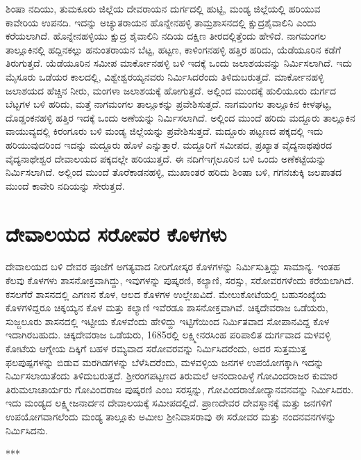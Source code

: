 ಶಿಂಷಾ ನದಿಯು, ತುಮಕೂರು ಜಿಲ್ಲೆಯ ದೇವರಾಯನ ದುರ್ಗದಲ್ಲಿ ಹುಟ್ಟಿ, ಮಂಡ್ಯ ಜಿಲ್ಲೆಯಲ್ಲಿ ಹರಿಯುವ ಕಾವೇರಿಯ ಉಪನದಿ. ಇದನ್ನು ಅಚ್ಯುತರಾಯನ ಹೊನ್ನೇನಹಳ್ಳಿ ತಾಮ್ರಶಾಸನದಲ್ಲಿ ಕ್ಷುದ್ರಶೈವಾಲಿನಿ ಎಂದು ಕರೆಯಲಾಗಿದೆ. ಹೊನ್ನೇನಹಳ್ಳಿಯು ಕ್ಷುದ್ರ ಶೈವಾಲಿನಿ ನದಿಯ ದಕ್ಷಿಣ ತೀರದಲ್ಲಿತ್ತೆಂದು ಹೇಳಿದೆ. ನಾಗಮಂಗಲ ತಾಲ್ಲೂಕಿನಲ್ಲಿ ಹದ್ದಿನ\-ಕಲ್ಲು ಹನುಂತರಾಯನ ಬೆಟ್ಟ, ಹಟ್ಟಣ, ಕಾಳಿಂಗನಹಳ್ಳಿ ಹತ್ತಿರ ಹರಿದು, \hbox{ಯೆಡೆಯೂರಿನ} ಕಡೆಗೆ ತಿರುಗುತ್ತದೆ. \hbox{ಯೆಡೆಯೂರಿನ} ಸಮೀಪ ಮಾರ್ಕೋನಹಳ್ಳಿ ಬಳಿ ಇದಕ್ಕೆ ಒಂದು ಜಲಾಶಯವನ್ನು ನಿರ್ಮಿಸಲಾಗಿದೆ. ಇದು ಮೈಸೂರು ಒಡೆಯರ ಕಾಲದಲ್ಲಿ, ವಿಶ್ವೇಶ್ವರಯ್ಯನವರು ನಿರ್ಮಿಸಿದರೆಂದು ತಿಳಿದುಬರುತ್ತದೆ. ಮಾರ್ಕೋನಹಳ್ಳಿ ಜಲಾಶಯದ ಹೆಚ್ಚಿನ ನೀರು, ಮಂಗಳಾ ಜಲಾಶಯಕ್ಕೆ ಹೋಗುತ್ತದೆ. ಅಲ್ಲಿಂದ ಮುಂದಕ್ಕೆ ಹುಲಿಯೂರು ದುರ್ಗದ ಬೆಟ್ಟಗಳ ಬಳಿ ಹರಿದು, ಮತ್ತೆ ನಾಗಮಂಗಲ ತಾಲ್ಲೂಕನ್ನು ಪ್ರವೇಶಿಸುತ್ತದೆ. ನಾಗಮಂಗಲ ತಾಲ್ಲೂಕಿನ ಕೀಳಘಟ್ಟ, ದೊಡ್ಡಂಕನಹಳ್ಳಿ ಹತ್ತಿರ ಇದಕ್ಕೆ ಒಂದು ಅಣೆಯನ್ನು ನಿರ್ಮಿಸಲಾಗಿದೆ. ಅಲ್ಲಿಂದ ಮುಂದೆ ಹರಿದು ಮದ್ದೂರು ತಾಲ್ಲೂಕಿನ ವಾಯುವ್ಯದಲ್ಲಿ ಕಿರಂಗೂರು ಬಳಿ ಮಂಡ್ಯ ಜಿಲ್ಲೆಯನ್ನು ಪ್ರವೇಶಿಸುತ್ತದೆ. ಮದ್ದೂರು ಪಟ್ಟಣದ ಪಕ್ಕದಲ್ಲಿ ಇದು ಹರಿಯುವುದರಿಂದ ಇದನ್ನು ಮದ್ದೂರು ಹೊಳೆ ಎನ್ನುತ್ತಾರೆ. ಮದ್ದೂರಿಗೆ ಸಮೀಪದ, ಪ್ರಖ್ಯಾತ ವೈದ್ಯನಾಥಪುರದ ವೈದ್ಯನಾಥೇಶ್ವರ ದೇವಾಲಯದ ಪಕ್ಕದಲ್ಲೇ ಹರಿಯುತ್ತದೆ. ಈ ನದಿಗೆ\break ಇಗ್ಗಲೂರಿನ ಬಳಿ ಒಂದು ಅಣೆಕಟ್ಟೆಯನ್ನು ನಿರ್ಮಿಸಲಾಗಿದೆ. ಅಲ್ಲಿಂದ ಮುಂದೆ ತೊರೆಕಾಡನಹಳ್ಳಿ, ಮುಖಾಂತರ ಹರಿದು ಶಿಂಷಾ ಬಳಿ, ಗಗನಚುಕ್ಕಿ ಜಲಪಾತದ ಮುಂದೆ ಕಾವೇರಿ ನದಿಯನ್ನು ಸೇರುತ್ತದೆ.

\section*{ದೇವಾಲಯದ ಸರೋವರ ಕೊಳಗಳು}

ದೇವಾಲಯದ ಬಳಿ ದೇವರ ಪೂಜೆಗೆ ಅಗತ್ಯವಾದ ನೀರಿಗೋಸ್ಕರ ಕೊಳಗಳನ್ನು ನಿರ್ಮಿಸುತ್ತಿದ್ದು ಸಾಮಾನ್ಯ. ಇಂತಹ ಕೆಲವು ಕೊಳಗಳು ಶಾಸನೋಕ್ತವಾಗಿದ್ದು, ಇವುಗಳನ್ನು ಪುಷ್ಕರಣಿ, ಕಲ್ಯಾಣಿ, ಸರಸ್ಸು, ಸರೋವರಗಳೆಂದು ಕರೆಯಲಾಗಿದೆ. ಕಸಲಗೆರೆ ಶಾಸನದಲ್ಲಿ ಎಗಣನ ಕೊಳ, ಆಲದ ಕೊಳಗಳ ಉಲ್ಲೇಖವಿದೆ. ಮೇಲುಕೋಟೆಯಲ್ಲಿ ಬಹುಸಂಖ್ಯೆಯ ಕೊಳಗಳಿದ್ದರೂ ಚಿಕ್ಕಯ್ಯನ ಕೊಳ ಮತ್ತು ಕಲ್ಯಾಣಿ ಇವೆರಡೂ ಶಾಸನೋಕ್ತವಾಗಿವೆ. ಚಿಕ್ಕದೇವರಾಜ ಒಡೆಯರು, ಸುಜ್ಜಲೂರು ಶಾಸನದಲ್ಲಿ ಇಟ್ಟೀಯ ಕೊಳವೆಂದು ಹೇಳಿದ್ದು ಇಟ್ಟಿಗೆಯಿಂದ ನಿರ್ಮಿತವಾದ ಸೋಪಾನವಿದ್ದ ಕೊಳ ಇದಾಗಿರಬಹುದು. ಚಿಕ್ಕದೇವರಾಜ ಒಡೆಯರು, 1685ರಲ್ಲಿ ಲಕ್ಷ್ಮೀನರಸಿಂಹ ಪರಿಪಾಲಿತ ದುರ್ಗವಾದ ಮಳವಳ್ಳಿ ಕೋಟೆಯ ಆಗ್ನೇಯ ದಿಕ್ಕಿಗೆ ಬಹಳ ರಮ್ಯವಾದ ಸರೋವರವನ್ನು ನಿರ್ಮಿಸಿದರೆಂದು, ಅದರ ಸುತ್ತಮುತ್ತ ಫಲಪುಷ್ಪಗಳನ್ನು ಬಿಡುವ ಮರಗಿಡಗಳನ್ನು ಬೆಳೆಸಿದರೆಂದು, ಮಳವಳ್ಳಿಯ ಜನಗಳ ಉಪಯೋಗಕ್ಕಾಗಿ ಇದನ್ನು ನಿರ್ಮಿಸಲಾಯಿತೆಂದು ತಿಳಿದುಬರುತ್ತದೆ. ಶ‍್ರೀರಂಗಪಟ್ಟಣದ ತಿರುಮಲೆ ಆನಂದಾಂಪಿಳ್ಳೆ ಗೋವಿಂದರಾಜರ ಕುಮಾರ ತಿರುಮಲಾಚಾರ್ಯರು ಗೋವಿಂದರಾಜ ಪುಷ್ಕರಣಿ ಎಂಬ ಸರಸ್ಸನ್ನು, ಗೋವಿಂದರಾಜೋದ್ಯಾನವನವನ್ನು ನಿರ್ಮಿಸಿದರು. ಇದು ಮಂಡ್ಯದ ಲಕ್ಷ್ಮೀಜನಾರ್ದನ ದೇವಾಲಯಕ್ಕೆ ಸಮೀಪದಲ್ಲಿದೆ. ಪ್ರಾಣದೇವರ ದೇವಸ್ಥಾನಕ್ಕೆ ಮತ್ತು ಜನಗಳಿಗೆ ಉಪಯೋಗವಾಗಲೆಂದು ಮಂಡ್ಯ ತಾಲ್ಲೂಕು ಅಮೀಲ ಶ‍್ರೀನಿವಾಸರಾವು ಈ ಸರೋವರ ಮತ್ತು ನಂದನವನಗಳನ್ನು ನಿರ್ಮಿಸಿದನು.

\begin{center}
***
\end{center}

\theendnotes

